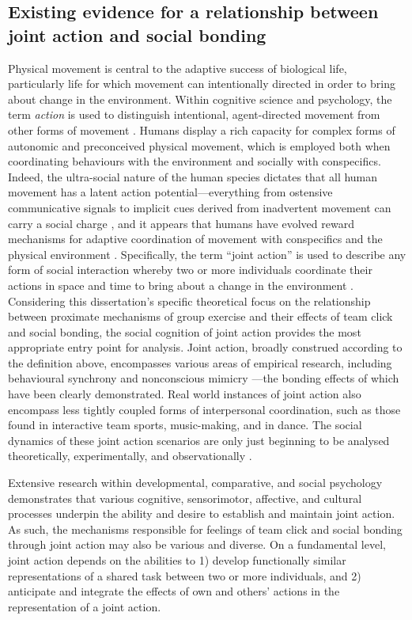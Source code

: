 \begin{CJK}{UTF8}{gbsn}
\clearpage
\section{Existing evidence for a relationship between joint action and social bonding} %
Physical movement is central to the adaptive success of biological life, particularly life for which movement can intentionally directed in order to bring about change in the environment.  Within cognitive science and psychology, the term \textit{action} is used to distinguish intentional, agent-directed movement from other forms of movement \citep{Davidson1980}.  Humans display a rich capacity for complex forms of autonomic and preconceived physical movement, which is employed both when coordinating behaviours with the environment and socially with conspecifics.
Indeed, the ultra-social nature of the human species dictates that all human movement has a latent action potential---everything from ostensive communicative signals to implicit cues derived from inadvertent movement can carry a social charge \citep{Danchin2004}, and it appears that humans have evolved reward mechanisms for adaptive coordination of movement with conspecifics and the physical environment \citep{Wheatley2012,Parkinson2015,Wheatley2016}.
Specifically, the term ``joint action'' is used to describe any form of social interaction whereby two or more individuals coordinate their actions in space and time to bring about a change in the environment \citep{Sebanz2006a}. Considering this dissertation's specific theoretical focus on the relationship between proximate mechanisms of group exercise and their effects of team click and social bonding, the social cognition of joint action provides the most appropriate entry point for analysis.  Joint action, broadly construed according to the definition above, encompasses various areas of empirical research, including behavioural synchrony \citep{Reddish2013,Launay2016,Mogan2017} and nonconscious mimicry \citep{Bargh2012}---the bonding effects of which have been clearly demonstrated.  Real world instances of joint action also encompass less tightly coupled forms of interpersonal coordination, such as those found in interactive team sports, music-making, and in dance.  The social dynamics of these joint action scenarios are only just beginning to be analysed theoretically, experimentally, and observationally \citep{Marsh2009}.

Extensive research within developmental, comparative, and social psychology demonstrates that various cognitive, sensorimotor, affective, and cultural processes underpin the ability and desire to establish and maintain joint action.  As such, the mechanisms responsible for feelings of team click and social bonding through joint action may also be various and diverse.  On a fundamental level, joint action depends on the abilities to 1) develop functionally similar representations of a shared task between two or more individuals, and 2) anticipate and integrate the effects of own and others' actions in the representation of a joint action\citep{Sebanz2006a}.


\end{CJK}
